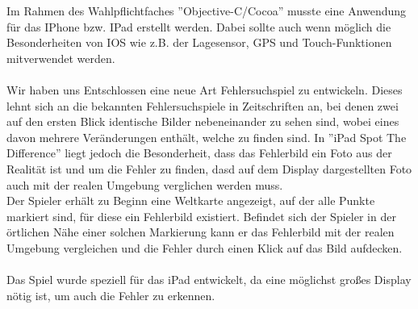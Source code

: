 Im Rahmen des Wahlpflichtfaches ''Objective-C/Cocoa'' musste eine Anwendung für das IPhone bzw. IPad erstellt werden. Dabei sollte auch wenn möglich die Besonderheiten von IOS wie z.B. der Lagesensor, GPS und Touch-Funktionen mitverwendet werden.\\
\\
Wir haben uns Entschlossen eine neue Art Fehlersuchspiel zu entwickeln. Dieses lehnt sich an die bekannten Fehlersuchspiele in Zeitschriften an, bei denen zwei auf den ersten Blick identische Bilder nebeneinander zu sehen sind, wobei eines davon mehrere Veränderungen enthält, welche zu finden sind. In ''iPad Spot The Difference'' liegt jedoch die Besonderheit, dass das Fehlerbild ein Foto aus der Realität ist und um die Fehler zu finden, dasd auf dem Display dargestellten Foto auch mit der realen Umgebung verglichen werden muss.\\
Der Spieler erhält zu Beginn eine Weltkarte angezeigt, auf der alle Punkte markiert sind, für diese ein Fehlerbild existiert. Befindet sich der Spieler in der örtlichen Nähe einer solchen Markierung kann er das Fehlerbild mit der realen Umgebung vergleichen und die Fehler durch einen Klick auf das Bild aufdecken.\\
\\
Das Spiel wurde speziell für das iPad entwickelt, da eine möglichst großes Display nötig ist, um auch die Fehler zu erkennen.